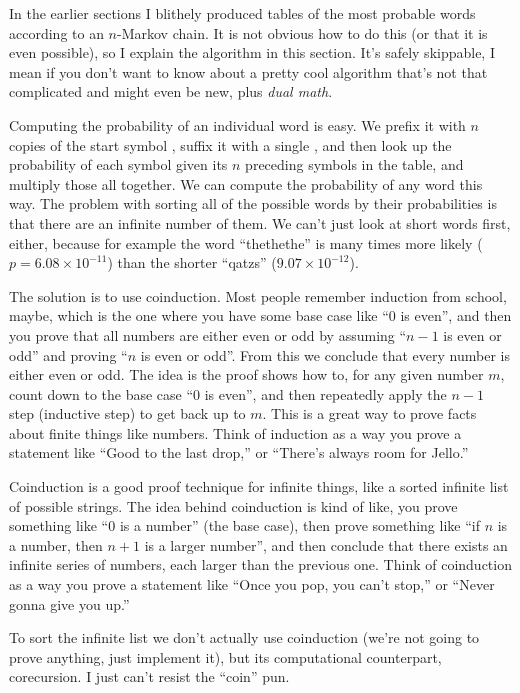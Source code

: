 \documentclass[twocolumn]{article}
\begin{document}
In the earlier sections I blithely produced tables of the most
probable words according to an $n$-Markov chain. It is not obvious how
to do this (or that it is even possible), so I explain the algorithm
in this section. It's safely skippable, I mean if you don't want to
know about a pretty cool algorithm that's not that complicated and
might even be new, plus {\em dual math}.

Computing the probability of an individual word is easy. We prefix it
with $n$ copies of the start symbol \<, suffix it with a single \>,
and then look up the probability of each symbol given its $n$
preceding symbols in the table, and multiply those all together. We
can compute the probability of any word this way. The problem with
sorting all of the possible words by their probabilities is that there
are an infinite number of them. We can't just look at short words
first, either, because for example the word ``thethethe'' is many
times more likely ($p = 6.08\times 10^{-11}$) than the shorter
``qatzs'' ($9.07\times 10^{-12}$).

The solution is to use coinduction. Most people remember induction
from school, maybe, which is the one where you have some base case
like ``0 is even'', and then you prove that all numbers are either
even or odd by assuming ``$n - 1$ is even or odd'' and proving ``$n$
is even or odd''. From this we conclude that every number is either
even or odd. The idea is the proof shows how to, for any given number
$m$, count down to the base case ``0 is even'', and then repeatedly
apply the $n-1$ step (inductive step) to get back up to $m$. This is a
great way to prove facts about finite things like numbers. Think of
induction as a way you prove a statement like ``Good to the last
drop,'' or ``There's always room for Jello.''

Coinduction is a good proof technique for infinite things, like a
sorted infinite list of possible strings. The idea behind coinduction
is kind of like, you prove something like ``0 is a number'' (the base
case), then prove something like ``if $n$ is a number, then $n+1$ is a
larger number'', and then conclude that there exists an infinite
series of numbers, each larger than the previous one. Think of
coinduction as a way you prove a statement like ``Once you pop, you
can't stop,'' or ``Never gonna give you up.''

To sort the infinite list we don't actually use coinduction (we're
not going to prove anything, just implement it), but its computational
counterpart, corecursion. I just can't resist the ``coin'' pun.
\end{document}
